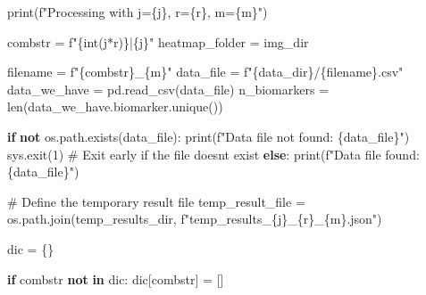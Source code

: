 \documentclass[
  letterpaper,
  DIV=11,
  numbers=noendperiod]{scrreprt}
\newenvironment{Shaded}{\begin{snugshade}}{\end{snugshade}}
\newcommand{\BuiltInTok}[1]{\textcolor[rgb]{0.00,0.23,0.31}{#1}}
\newcommand{\CommentTok}[1]{\textcolor[rgb]{0.37,0.37,0.37}{#1}}
\newcommand{\ControlFlowTok}[1]{\textcolor[rgb]{0.00,0.23,0.31}{\textbf{#1}}}
\newcommand{\DecValTok}[1]{\textcolor[rgb]{0.68,0.00,0.00}{#1}}
\newcommand{\KeywordTok}[1]{\textcolor[rgb]{0.00,0.23,0.31}{\textbf{#1}}}
\newcommand{\NormalTok}[1]{\textcolor[rgb]{0.00,0.23,0.31}{#1}}
\newcommand{\OperatorTok}[1]{\textcolor[rgb]{0.37,0.37,0.37}{#1}}
\newcommand{\SpecialCharTok}[1]{\textcolor[rgb]{0.37,0.37,0.37}{#1}}
\newcommand{\SpecialStringTok}[1]{\textcolor[rgb]{0.13,0.47,0.30}{#1}}
\begin{document}
\begin{Shaded}
\begin{Highlighting}[]
    \BuiltInTok{print}\NormalTok{(}\SpecialStringTok{f"Processing with j=}\SpecialCharTok{\{}\NormalTok{j}\SpecialCharTok{\}}\SpecialStringTok{, r=}\SpecialCharTok{\{}\NormalTok{r}\SpecialCharTok{\}}\SpecialStringTok{, m=}\SpecialCharTok{\{}\NormalTok{m}\SpecialCharTok{\}}\SpecialStringTok{"}\NormalTok{)}

\NormalTok{    combstr }\OperatorTok{=} \SpecialStringTok{f"}\SpecialCharTok{\{}\BuiltInTok{int}\NormalTok{(j}\OperatorTok{*}\NormalTok{r)}\SpecialCharTok{\}}\SpecialStringTok{|}\SpecialCharTok{\{}\NormalTok{j}\SpecialCharTok{\}}\SpecialStringTok{"}
\NormalTok{    heatmap\_folder }\OperatorTok{=}\NormalTok{ img\_dir}
    
\NormalTok{    filename }\OperatorTok{=} \SpecialStringTok{f"}\SpecialCharTok{\{}\NormalTok{combstr}\SpecialCharTok{\}}\SpecialStringTok{\_}\SpecialCharTok{\{}\NormalTok{m}\SpecialCharTok{\}}\SpecialStringTok{"}
\NormalTok{    data\_file }\OperatorTok{=} \SpecialStringTok{f"}\SpecialCharTok{\{}\NormalTok{data\_dir}\SpecialCharTok{\}}\SpecialStringTok{/}\SpecialCharTok{\{}\NormalTok{filename}\SpecialCharTok{\}}\SpecialStringTok{.csv"}
\NormalTok{    data\_we\_have }\OperatorTok{=}\NormalTok{ pd.read\_csv(data\_file)}
\NormalTok{    n\_biomarkers }\OperatorTok{=} \BuiltInTok{len}\NormalTok{(data\_we\_have.biomarker.unique())}

    \ControlFlowTok{if} \KeywordTok{not}\NormalTok{ os.path.exists(data\_file):}
        \BuiltInTok{print}\NormalTok{(}\SpecialStringTok{f"Data file not found: }\SpecialCharTok{\{}\NormalTok{data\_file}\SpecialCharTok{\}}\SpecialStringTok{"}\NormalTok{)}
\NormalTok{        sys.exit(}\DecValTok{1}\NormalTok{)  }\CommentTok{\# Exit early if the file doesn\textquotesingle{}t exist}
    \ControlFlowTok{else}\NormalTok{:}
        \BuiltInTok{print}\NormalTok{(}\SpecialStringTok{f"Data file found: }\SpecialCharTok{\{}\NormalTok{data\_file}\SpecialCharTok{\}}\SpecialStringTok{"}\NormalTok{)}

    \CommentTok{\# Define the temporary result file}
\NormalTok{    temp\_result\_file }\OperatorTok{=}\NormalTok{ os.path.join(temp\_results\_dir, }\SpecialStringTok{f"temp\_results\_}\SpecialCharTok{\{}\NormalTok{j}\SpecialCharTok{\}}\SpecialStringTok{\_}\SpecialCharTok{\{}\NormalTok{r}\SpecialCharTok{\}}\SpecialStringTok{\_}\SpecialCharTok{\{}\NormalTok{m}\SpecialCharTok{\}}\SpecialStringTok{.json"}\NormalTok{)}
    
\NormalTok{    dic }\OperatorTok{=}\NormalTok{ \{\}}

    \ControlFlowTok{if}\NormalTok{ combstr }\KeywordTok{not} \KeywordTok{in}\NormalTok{ dic:}
\NormalTok{        dic[combstr] }\OperatorTok{=}\NormalTok{ []}


\end{Highlighting}
\end{Shaded}
\end{document}
